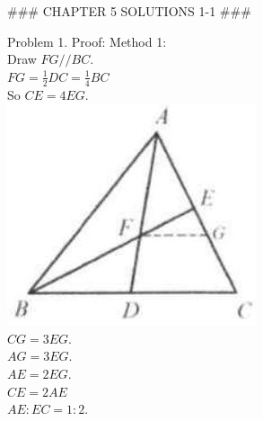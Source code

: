 \documentclass[10pt]{article}
\begin{document}
### CHAPTER 5 SOLUTIONS 1-1 ###

Problem 1. Proof:
Method 1:\\
Draw \(F G / / B C\).\\
\(F G=\frac{1}{2} D C=\frac{1}{4} B C\)\\
So \(C E=4 E G\).\\
\includegraphics[max width=\textwidth, center]{2025_04_17_97bc1f7e44d93c271a88g-131(3)}\\
\(C G=3 E G\).\\
\(A G=3 E G\).\\
\(A E=2 E G\).\\
\(C E=2 A E\)\\
\(A E: E C=1: 2\).
\end{document}
